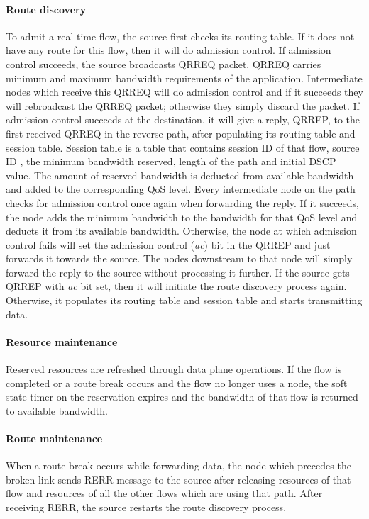 \paragraph*{Route discovery}
To admit a real time flow, the source first checks its routing table. If it does not have any route for this flow, then it will do admission control. If admission control succeeds, the source broadcasts QRREQ packet. QRREQ carries minimum and maximum bandwidth requirements of the application. Intermediate nodes which receive this QRREQ will do admission control and if it succeeds they will rebroadcast the QRREQ packet; otherwise they simply discard the packet. If admission control succeeds at the destination, it will give a reply, QRREP, to the first received QRREQ in the reverse path, after populating its routing table and session table. Session table is a table that contains session ID of that flow, source ID , the minimum bandwidth reserved, length of the path and initial DSCP value. The amount of reserved bandwidth is deducted from available bandwidth and added to the corresponding QoS level. Every intermediate node on the path checks for admission control once again when forwarding the reply. If it succeeds, the node adds the minimum bandwidth to the bandwidth for that QoS level and deducts it from its available bandwidth. Otherwise, the node at which admission control fails will set the admission control (\textit{ac}) bit in the QRREP and just forwards it towards the source. The nodes downstream to that node will simply forward the reply to the source without processing it further. If the source gets QRREP with \textit{ac} bit set, then it will initiate the route discovery process again. Otherwise, it populates its routing table and session table and starts transmitting data.

\paragraph*{Resource maintenance}
Reserved resources are refreshed through data plane operations. If the flow is completed or a route break occurs and the flow no longer uses a node, the soft state timer on the reservation expires and the bandwidth of that flow is returned to available bandwidth.

\paragraph*{Route maintenance}
When a route break occurs while forwarding data, the node which precedes the broken link sends RERR message to the source after releasing resources of that flow and resources of all the other flows which are using that path. After receiving RERR, the source restarts the route discovery process.


